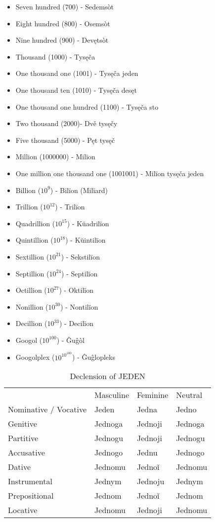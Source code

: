 \begin{itemize}
	\item Seven hundred (700) - Sedemsòt
	\item Eight hundred (800) - Osemsòt
	\item Nine hundred (900) - Devętsòt
	\item Thousand (1000) - Tysęča
	\item One thousand one (1001) - Tysęča jeden
	\item One thousand ten (1010) - Tysęča desęt
	\item One thousand one hundred (1100) - Tysęča sto
	\item Two thousand (2000)- Dvě tysęčy
	\item Five thousand (5000) - Pęt tysęč
	\item Million (1000000) - Milïon
	\item One million one thousand one (1001001) - Milïon tysęča jeden
	\item Billion ($10^9$) - Bilïon (Milïard)
	\item Trillion ($10^{12}$) - Trilïon
	\item Quadrillion ($10^{15}$) - Kŭadrilïon
	\item Quintillion ($10^{18}$) - Kŭintilïon
	\item Sextillion ($10^{21}$) - Sekstilïon
	\item Septillion ($10^{24}$) - Septilïon
	\item Octillion ($10^{27}$) - Oktilïon
	\item Nonillion ($10^{30}$) - Nontilïon
	\item Decillion ($10^{33}$) - Decilïon
	\item Googol ($10^{100}$) - Ĝuĝòl
	\item Googolplex ($10^{10^{100}}$) - Ĝuĝlopleks
\end{itemize}

\begin{table}[!htb]
	\caption{Declension of JEDEN} 
	\begin{tabular}{llll}
		& Masculine & Feminine & Neutral \\
		Nominative / Vocative & Jeden & Jedna & Jedno \\
		Genitive & Jednoga & Jednoji & Jednoga \\
		Partitive & Jednogu & Jednoji & Jednogu \\
		Accusative & Jednogo & Jednu & Jednogo \\
		Dative & Jednomu & Jednoǐ & Jednomu \\
		Instrumental & Jednym & Jednoju & Jednym \\
		Prepositional & Jednom & Jednoǐ & Jednom \\
		Locative & Jednomu & Jednoji & Jednomu \\
	\end{tabular}
\end{table}

